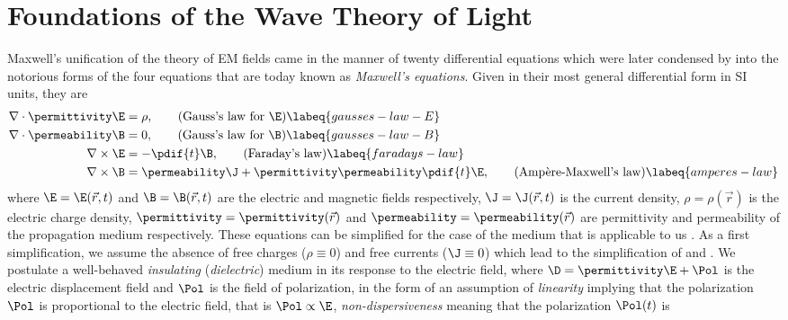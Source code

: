 \section[Wave Theory of Light]{Foundations of the Wave Theory of Light}%

Maxwell's unification of the theory of \ac{EM} fields came in the manner of twenty differential equations which were 
    later condensed by  into the notorious forms of the four equations that are today known 
    as \emph{Maxwell's equations}.
Given in their most general differential form in \acs{SI} units, they are
    \begin{align}
        \nabla \cdot \permittivity \E &= \rho, \tag{\text{Gauss's law for \(\E\)}}\labeq{gausses-law-E}\\ 
        \nabla \cdot \permeability \B &= 0, \tag{\text{Gauss's law for \(\B\)}}\labeq{gausses-law-B}\\  
        \nabla \times \E &= -\pdif{t}\B, \tag{\text{Faraday's law}} \labeq{faradays-law} \\
        \nabla \times \B &= \permeability \J  + \permittivity \permeability \pdif{t}\E, \tag{\text{Ampère-Maxwell's law}} \labeq{amperes-law}
    \end{align}
    where \(\E=\E(\vec{r}, t)\) and \(\B=\B(\vec{r}, t)\) are the electric and magnetic fields respectively, 
    \(\J=\J(\vec{r}, t)\) is the current density, \(\rho = \rho(\vec{r})\) is the electric charge density, \(\permittivity = 
    \permittivity(\vec{r})\) and \(\permeability = \permeability(\vec{r})\) are permittivity and permeability of the 
    propagation medium respectively.
These equations can be simplified for the case of the medium that is applicable to us .
As a first simplification, we assume the absence of free charges (\(\rho \equiv 0\)) and free currents (\(\J \equiv 0\)) 
    which lead to the simplification of  and .
We postulate a well-behaved \emph{insulating} (\emph{dielectric}) medium in its response to the electric field, where 
    \(\D = \permittivity \E + \Pol\) is the electric displacement field and \(\Pol\) is the field of polarization, in 
    the form of an assumption of \emph{linearity} implying that the polarization \(\Pol\) is proportional to the 
    electric field, that is \(\Pol \propto \E\), \emph{non-dispersiveness} meaning that the polarization \(\Pol(t)\) is 
